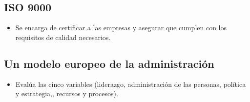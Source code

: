 \documentclass{article}
\begin{document}
\subsection{ISO 9000}
\begin{itemize}
    \item Se encarga de certificar a las empresas y asegurar que cumplen con los requisitos de calidad necesarios.
\end{itemize}

\subsection{Un modelo europeo de la administración}
\begin{itemize}
    \item Evalúa las cinco variables (liderazgo, administración de las personas, política y estrategia,, recursos y procesos). 
\end{itemize}
\end{document}
